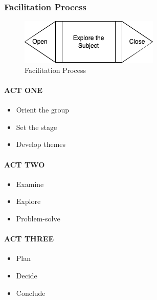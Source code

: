 \documentclass[
]{book}
\providecommand{\tightlist}{%
  \setlength{\itemsep}{0pt}\setlength{\parskip}{0pt}}
\begin{document}
\hypertarget{facilitation-process}{%
\subsubsection*{Facilitation Process}\label{facilitation-process}}

\begin{figure}
\centering
\includegraphics{assets/presentations/facilitation/fac-process.drawio.png}
\caption{Facilitation Process}
\end{figure}

\hypertarget{act-one}{%
\paragraph*{ACT ONE}\label{act-one}}

\begin{itemize}
\tightlist
\item
  Orient the group
\item
  Set the stage
\item
  Develop themes
\end{itemize}

\hypertarget{act-two}{%
\paragraph*{ACT TWO}\label{act-two}}

\begin{itemize}
\tightlist
\item
  Examine
\item
  Explore
\item
  Problem-solve
\end{itemize}

\hypertarget{act-three}{%
\paragraph*{ACT THREE}\label{act-three}}

\begin{itemize}
\tightlist
\item
  Plan
\item
  Decide
\item
  Conclude
\end{itemize}
\end{document}
